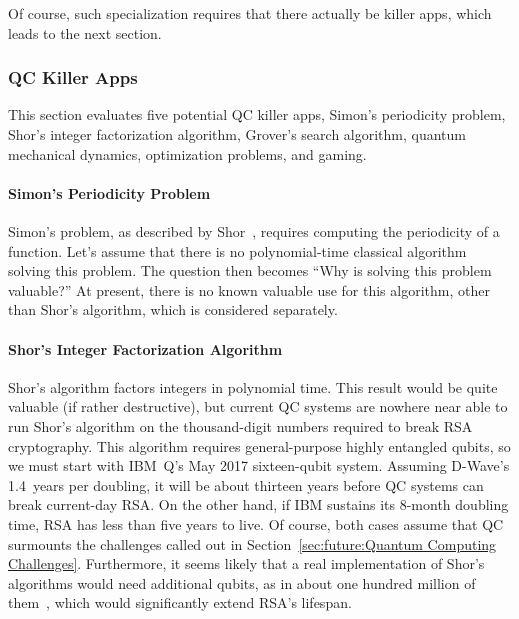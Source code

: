 Of course, such specialization requires that there actually be killer
apps, which leads to the next section.

\subsubsection{QC Killer Apps}
\label{sec:future:QC Killer Apps}

This section evaluates five potential QC killer apps,
Simon's periodicity problem,
Shor's integer factorization algorithm,
Grover's search algorithm,
quantum mechanical dynamics,
optimization problems, and
gaming.

\paragraph{Simon's Periodicity Problem}
\label{sec:future:Simon's Periodicity Problem}

Simon's problem, as described by
Shor~\cite{PeterWSchor2001QuantumAlgorithms},
requires computing the periodicity of a function.
Let's assume that there is no polynomial-time classical
algorithm solving this problem.
The question then becomes ``Why is solving this problem valuable?''
At present, there is no known valuable use for this algorithm,
other than Shor's algorithm, which is considered separately.

\paragraph{Shor's Integer Factorization Algorithm}
\label{sec:future:Shor's Integer Factorization Algorithm}

Shor's algorithm factors integers in polynomial time.
This result would be quite valuable (if rather destructive),
but current QC systems are nowhere near able to run
Shor's algorithm on the thousand-digit numbers required
to break RSA cryptography.
This algorithm requires general-purpose highly entangled qubits,
so we must start with IBM~Q's May 2017 sixteen-qubit system.
Assuming D-Wave's 1.4~years per doubling, it will be about thirteen
years before QC systems can break current-day RSA.
On the other hand, if IBM sustains its 8-month doubling time, RSA has
less than five years to live.
Of course, both cases assume that QC surmounts the challenges called
out in Section~\ref{sec:future:Quantum Computing Challenges}.
Furthermore, it seems likely that a real implementation of Shor's
algorithms would need additional qubits, as in about one hundred
million of them~\cite{RachelCourtland2017GoogleQC},
which would significantly extend RSA's lifespan.

